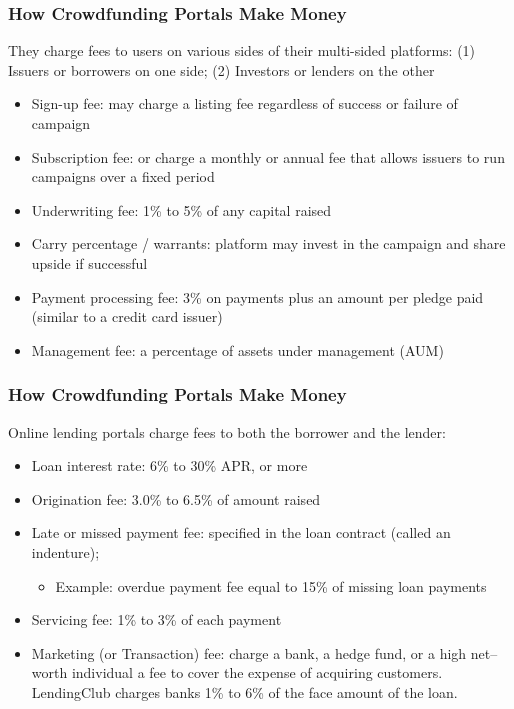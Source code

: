 \documentclass[aspectratio=169,xcolor=dvipsnames]{beamer}
\begin{document}
\begin{frame}
\frametitle{How Crowdfunding Portals Make Money}


They charge fees to users on various sides of their multi-sided platforms: (1) Issuers or borrowers on one side; (2) Investors or lenders on the other
 

\medskip 


\begin{itemize}
    \item Sign-up fee: may charge a listing fee regardless of success or failure of campaign
    \item Subscription fee: or charge a monthly or annual fee that allows issuers to run campaigns over a fixed period
    \item Underwriting fee: 1\% to 5\% of any capital raised
    \item Carry percentage / warrants: platform may invest in the campaign and share upside if successful
    \item Payment processing fee: 3\% on payments plus an amount per pledge paid (similar to a credit card issuer)
    \item Management fee: a percentage of assets under management (AUM)
\end{itemize}



\end{frame} 






\begin{frame}
\frametitle{How Crowdfunding Portals Make Money}


Online lending portals charge fees to both the borrower and the lender:
\begin{itemize}
    \item Loan interest rate: 6\% to 30\% APR, or more
    \item Origination fee: 3.0\% to 6.5\% of amount raised
    \item Late or missed payment fee: specified in the loan contract (called an indenture);
    \begin{itemize}
        \item Example: overdue payment fee equal to 15\% of missing loan payments
    \end{itemize}
    \item Servicing fee: 1\% to 3\% of each payment
    \item Marketing (or Transaction) fee: charge a bank, a hedge fund, or a high net–worth individual a fee to cover the expense of acquiring customers. LendingClub charges banks 1\% to 6\% of the face amount of the loan.
\end{itemize}



\end{frame} 
\end{document}
